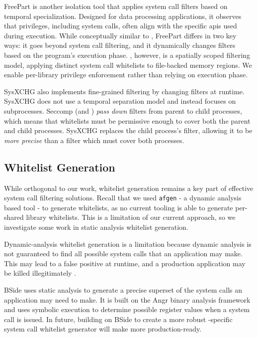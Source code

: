 FreePart \cite{ahad2023freepart} is another isolation tool that applies
system call filters based on temporal specialization. Designed for data
processing applications, it observes that privileges, including system calls,
often align with the specific \acp{api} used during execution. While
conceptually similar to \af, FreePart differs in two key ways: it goes
beyond system call filtering, and it dynamically changes filters based on
the program's execution phase. \af, however, is a spatially scoped filtering
model, applying distinct system call whitelists to file-backed memory regions.
We enable per-library privilege enforcement rather than relying on execution 
phase.

SysXCHG \cite{SYSXCHG} also implements fine-grained filtering by changing
filters at runtime. SysXCHG does not use a temporal separation model and instead
focuses on subprocesses. Seccomp (and \af) \textit{pass down} filters from
parent to child processes, which means that whitelists must be permissive enough
to cover both the parent and child processes. SysXCHG replaces the child
process's filter, allowing it to be \textit{more precise} than a filter which
must cover both processes.

\subsection{Whitelist Generation}

While orthogonal to our work, whitelist generation remains a key part of
effective system call filtering solutions. Recall that we used \texttt{afgen} -
a dynamic analysis based tool - to generate \af whitelists, as no current
tooling is able to generate per-shared library whitelists. This is a limitation
of our current approach, so we investigate some work in static analysis
whitelist generation.

Dynamic-analysis whitelist generation is a limitation because dynamic analysis
is not guaranteed to find all possible system calls that an application may
make. This may lead to a false positive at runtime, and a production application
may be killed illegitimately \cite{XING2022105}. 

BSide \cite{BSIDE} uses static analysis to generate a precise
superset of the system calls an application may need to make. It is built on 
the Angr \cite{angr2025} binary analysis framework and uses symbolic execution
to determine possible register values when a system call is issued. In future,
building on BSide to create a more robust \af-specific system call whitelist
generator will make \af more production-ready.

